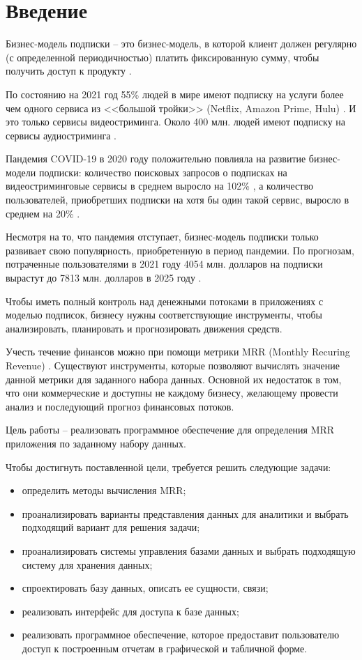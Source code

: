 \chapter*{Введение}

Бизнес-модель подписки -- это бизнес-модель, в которой клиент должен регулярно (с определенной периодичностью) платить фиксированную сумму, чтобы получить доступ к продукту \cite{subscriptionbm}.

По состоянию на 2021 год 55\% людей в мире имеют подписку на услуги более чем одного сервиса из <<большой тройки>> (Netflix, Amazon Prime, Hulu)  \cite{subscriptioncons}. И это только сервисы видеостриминга. Около 400 млн. людей имеют подписку на сервисы аудиостриминга \cite{audiostreaming}.

Пандемия COVID-19 в 2020 году положительно повлияла на развитие бизнес-модели подписки: количество поисковых запросов о подписках на видеостриминговые сервисы в среднем выросло на 102\% \cite{videostreamingsearch}, а количество пользователей, приобретших подписки на хотя бы один такой сервис, выросло в среднем на 20\% \cite{subgrowth}.

Несмотря на то, что пандемия отступает, бизнес-модель подписки только развивает свою популярность, приобретенную в период пандемии. По прогнозам, потраченные пользователями в 2021 году 4054 млн. долларов на подписки вырастут до 7813 млн. долларов в 2025 году \cite{subforecast}.

Чтобы иметь полный контроль над денежными потоками в приложениях с моделью подписок, бизнесу нужны соответствующие инструменты, чтобы анализировать, планировать и прогнозировать движения средств. 

Учесть течение финансов можно при помощи метрики MRR (Monthly Recuring Revenue) \cite{mrr}. Существуют инструменты, которые позволяют вычислять значение данной метрики для заданного набора данных. Основной их недостаток в том, что они коммерческие и доступны не каждому бизнесу, желающему провести анализ и последующий прогноз финансовых потоков.

Цель работы -- реализовать программное обеспечение для определения MRR приложения по заданному набору данных. 

Чтобы достигнуть поставленной цели, требуется решить следующие задачи:
\begin{itemize}
	\item определить методы вычисления MRR;
	\item проанализировать варианты представления данных для аналитики и выбрать подходящий вариант для решения задачи;
	\item проанализировать системы управления базами данных и выбрать подходящую систему для хранения данных;
	\item спроектировать базу данных, описать ее сущности, связи;
	\item реализовать интерфейс для доступа к базе данных;
	\item реализовать программное обеспечение, которое предоставит пользователю доступ к построенным отчетам в графической и табличной форме.
\end{itemize}